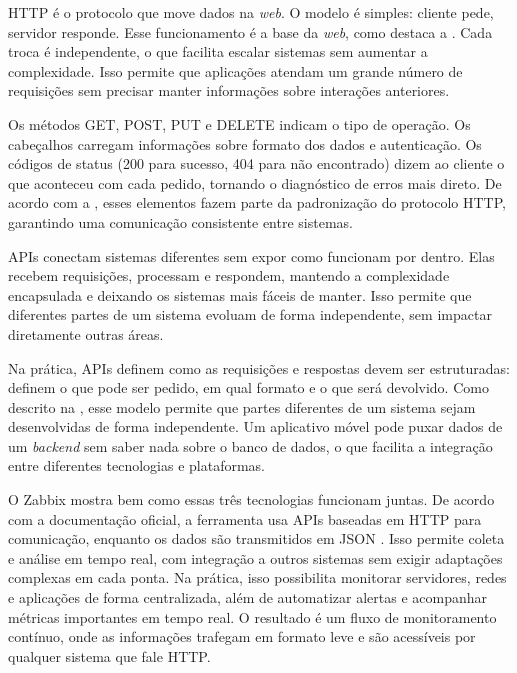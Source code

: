 \documentclass[
    12pt
    ,oneside
    ,a4paper
    ,chapter=TITLE
    ,section=TITLE
    ,sumario=abnt-6027-2012]{abntex2}
\begin{document}
HTTP é o protocolo que move dados na \textit{web}. O modelo é simples: cliente pede, servidor responde. Esse funcionamento é a base da \textit{web}, como destaca a . Cada troca é independente, o que facilita escalar sistemas sem aumentar a complexidade. Isso permite que aplicações atendam um grande número de requisições sem precisar manter informações sobre interações anteriores.

Os métodos GET, POST, PUT e DELETE indicam o tipo de operação. Os cabeçalhos carregam informações sobre formato dos dados e autenticação. Os códigos de status (200 para sucesso, 404 para não encontrado) dizem ao cliente o que aconteceu com cada pedido, tornando o diagnóstico de erros mais direto. De acordo com a , esses elementos fazem parte da padronização do protocolo HTTP, garantindo uma comunicação consistente entre sistemas.

APIs conectam sistemas diferentes sem expor como funcionam por dentro. Elas recebem requisições, processam e respondem, mantendo a complexidade encapsulada e deixando os sistemas mais fáceis de manter. Isso permite que diferentes partes de um sistema evoluam de forma independente, sem impactar diretamente outras áreas.

Na prática, APIs definem como as requisições e respostas devem ser estruturadas: definem o que pode ser pedido, em qual formato e o que será devolvido. Como descrito na , esse modelo permite que partes diferentes de um sistema sejam desenvolvidas de forma independente. Um aplicativo móvel pode puxar dados de um \textit{backend} sem saber nada sobre o banco de dados, o que facilita a integração entre diferentes tecnologias e plataformas.

O Zabbix mostra bem como essas três tecnologias funcionam juntas. De acordo com a documentação oficial, a ferramenta usa APIs baseadas em HTTP para comunicação, enquanto os dados são transmitidos em JSON \cite{zabbix}. Isso permite coleta e análise em tempo real, com integração a outros sistemas sem exigir adaptações complexas em cada ponta. Na prática, isso possibilita monitorar servidores, redes e aplicações de forma centralizada, além de automatizar alertas e acompanhar métricas importantes em tempo real. O resultado é um fluxo de monitoramento contínuo, onde as informações trafegam em formato leve e são acessíveis por qualquer sistema que fale HTTP.

\end{document}
